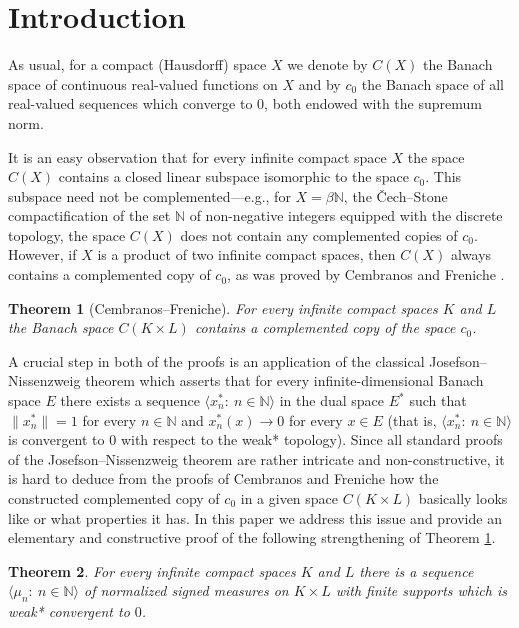 \documentclass[11pt]{amsart}
\newtheorem{theorem}{Theorem}[section]
\theoremstyle{definition}
\theoremstyle{remark}
\numberwithin{equation}{section}
\newcommand{\N}{\mathbb{N}}
\newcommand{\seqn}[1]{\big\langle#1\colon\ n\io\big\rangle}
\newcommand{\io}{\in\mathbb{N}}%
\begin{document}
\maketitle

\section{Introduction}

As usual, for a compact (Hausdorff) space $X$ we denote by $C(X)$ the Banach space of continuous real-valued functions on $X$ and by $c_0$ the Banach space of all real-valued sequences which converge to $0$, both endowed with the supremum norm.

It is an easy observation that for every infinite compact space $X$ the space $C(X)$ contains a closed linear subspace isomorphic to the space $c_0$. This subspace need not be complemented---e.g., for $X=\beta\N$, the \v{C}ech--Stone compactification of the set $\N$ of non-negative integers equipped with the discrete topology, the space $C(X)$ does not contain any complemented copies of $c_0$. However, if $X$ is a product of two infinite compact spaces, then $C(X)$ always contains a complemented copy of $c_0$, as was proved by Cembranos \cite{Cem84} and Freniche \cite{Fre84}.

\begin{theorem}[Cembranos--Freniche]\label{theorem:cemfre}
For every infinite compact spaces $K$ and $L$ the Banach space $C(K\times L)$ contains a complemented copy of the space $c_0$.
\end{theorem}

A crucial step in both of the proofs is an application of the classical Josefson--Nissenzweig theorem which asserts that for every infinite-dimensional Banach space $E$ there exists a sequence $\seqn{x_n^*}$ in the dual space $E^*$ such that $\|x_n^*\|=1$ for every $n\io$ and $x_n^*(x)\to0$ for every $x\in E$ (that is, $\seqn{x_n^*}$ is convergent to $0$ with respect to the weak* topology). Since all standard proofs of the Josefson--Nissenzweig theorem are rather intricate and non-constructive, it is hard to deduce from the proofs of Cembranos and Freniche how the constructed complemented copy of $c_0$ in a given space $C(K\times L)$ basically looks like or what properties it has. In this paper we address this issue and provide an elementary and constructive proof of the following strengthening of Theorem \ref{theorem:cemfre}.

\begin{theorem}\label{theorem:main}
For every infinite compact spaces $K$ and $L$ there is a sequence $\seqn{\mu_n}$ of normalized signed measures on $K\times L$ with finite supports which is weak* convergent to $0$.%
\end{theorem}
\end{document}

